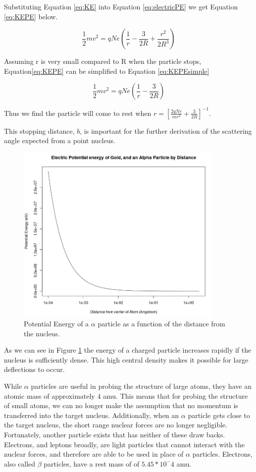 \documentclass[12pt]{article}
\begin{document}
Substituting Equation \ref{eq:KE} into Equation \ref{eq:electricPE} we get Equation \ref{eq:KEPE} below.

\begin{equation}\label{eq:KEPE}
    \frac{1}{2}mv^2 =  qNe(\frac{1}{r} - \frac{3}{2R} + \frac{r^2}{2R^3})
\end{equation}

Assuming r is very small compared to R when the particle stops, Equation\ref{eq:KEPE} can be simplified to Equation \ref{eq:KEPEsimple}

\begin{equation}\label{eq:KEPEsimple}
    \frac{1}{2}mv^2 = qNe(\frac{1}{r} - \frac{3}{2R})
\end{equation}

Thus we find the particle will come to rest when $r=[\frac{2qNe}{mv^2} + \frac{3}{2R}]^{-1}$.

This stopping distance, $b$, is important for the further derivation of the scattering angle expected from a point nucleus.



\begin{figure}
    \centering
    \includegraphics[width = 10cm]{ruthenergy}
    \caption{Potential Energy of a $\alpha$ particle as a function of the distance from the nucleus.}
    \label{fig:ruthenergy}
\end{figure}

As we can see in Figure \ref{fig:ruthenergy} the energy of a charged particle increases rapidly if the nucleus is sufficiently dense. This high central density makes it possible for large deflections to occur.

While $\alpha$ particles are useful in probing the structure of large atoms, they have an atomic mass of approximately $4$ amu.
This means that for probing the structure of small atoms, we can no longer make the assumption that no momentum is transferred into the target nucleus.
Additionally, when an $\alpha$ particle gets close to the target nucleus, the short range nuclear forces are no longer negligible.
Fortunately, another particle exists that has neither of these draw backs.
Electrons, and leptons broadly, are light particles that cannot interact with the nuclear forces, and therefore are able to be used in place of $\alpha$ particles.
Electrons, also called $\beta$ particles, have a rest mass of of $5.45*10^-4$ amu.
\end{document}
